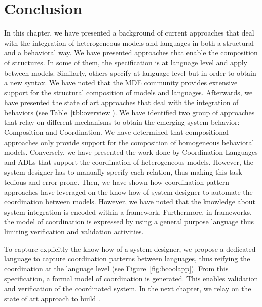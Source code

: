 \section{Conclusion}
In this chapter, we have presented a background of current approaches that deal with the integration of heterogeneous models and languages in both a structural and a behavioral way. We have presented approaches that enable the composition of structures. In some of them, the specification is at language level and apply between models. Similarly, others specify at language level but in order to obtain a new syntax. We have noted that the MDE community provides extensive support for the structural composition of models and languages. Afterwards, we have presented the state of art approaches that deal with the integration of behaviors (see Table~\ref{tbl:overview}). We have identified two group of approaches that relay on different mechanisms to obtain the emerging system behavior: Composition and Coordination. We have determined that compositional approaches only provide support for the composition of homogeneous behavioral models. Conversely, we have presented the work done by Coordination Languages and ADLs that support the coordination of heterogeneous models. However, the system designer has to manually specify each relation, thus making this task tedious and error prone. Then, we have shown how coordination pattern approaches have leveraged on the know-how of system designer to automate the coordination between models. However, we have noted that the knowledge about system integration is encoded within a framework. Furthermore, in frameworks, the model of coordination is expressed by using a general purpose language thus limiting verification and validation activities. 

To capture explicitly the know-how of a system designer, we propose \bcool a dedicated language to capture coordination patterns between languages, thus reifying the coordination at the language level (see Figure~\ref{fig:bcoolapp}). From this specification, a formal model of coordination is generated. This enables validation and verification of the coordinated system. In the next chapter, we relay on the state of art approach to build \bcool. 

